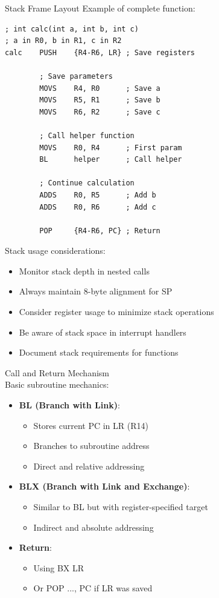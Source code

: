 \begin{example2}{Stack Frame Layout}
Example of complete function:
\begin{lstlisting}[language=armasm, style=base]
; int calc(int a, int b, int c)
; a in R0, b in R1, c in R2
calc    PUSH    {R4-R6, LR} ; Save registers
        
        ; Save parameters
        MOVS    R4, R0      ; Save a
        MOVS    R5, R1      ; Save b
        MOVS    R6, R2      ; Save c
        
        ; Call helper function
        MOVS    R0, R4      ; First param
        BL      helper      ; Call helper
        
        ; Continue calculation
        ADDS    R0, R5      ; Add b
        ADDS    R0, R6      ; Add c
        
        POP     {R4-R6, PC} ; Return
\end{lstlisting}
\end{example2}

\begin{remark}
Stack usage considerations:
\begin{itemize}
  \item Monitor stack depth in nested calls
  \item Always maintain 8-byte alignment for SP
  \item Consider register usage to minimize stack operations
  \item Be aware of stack space in interrupt handlers
  \item Document stack requirements for functions
\end{itemize}
\end{remark}

\begin{concept}{Call and Return Mechanism}\\
Basic subroutine mechanics:
\begin{itemize}
  \item \textbf{BL (Branch with Link)}:
    \begin{itemize}
      \item Stores current PC in LR (R14)
      \item Branches to subroutine address
      \item Direct and relative addressing
    \end{itemize}
  \item \textbf{BLX (Branch with Link and Exchange)}:
    \begin{itemize}
      \item Similar to BL but with register-specified target
      \item Indirect and absolute addressing
    \end{itemize}
  \item \textbf{Return}:
    \begin{itemize}
      \item Using BX LR
      \item Or POP {..., PC} if LR was saved
    \end{itemize}
\end{itemize}
\end{concept}

